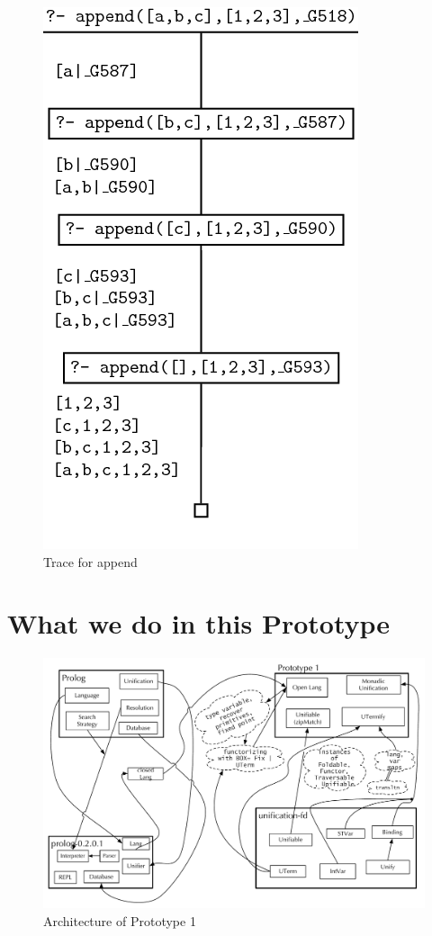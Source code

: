 \documentclass[thesis-solanki.tex]{subfiles}
\begin{document}
\begin{figure}[H]
\centering
\includegraphics[scale = 0.5]{PrologAppendWorking.png}
\caption{Trace for append \cite{webiste:learnprolognowappend}}
\label{fig:Trace for append}
\end{figure}

\section{What we do in this Prototype}

\begin{figure}[H]
  \includegraphics[width=1\textwidth]{Prototype-1.pdf}
  \caption{Architecture of Prototype 1}
  \label{fig:proto1-arch}
\end{figure}
\end{document}
